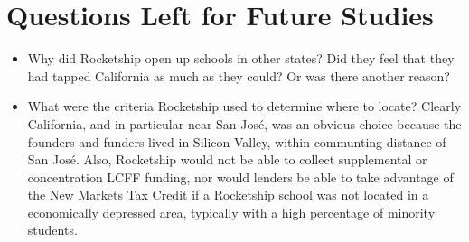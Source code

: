\section{Questions Left for Future Studies}\label{sec:future-studies}
\begin{itemize}
  \item Why did Rocketship open up schools in other states? Did they feel that they had tapped California as much as they could? Or was there another reason?
  \item What were the criteria Rocketship used to determine where to locate? Clearly California, and in particular near San José, was an obvious choice because the founders and funders lived in Silicon Valley, within communting distance of San José. Also, Rocketship would not be able to collect supplemental or concentration LCFF funding, nor would lenders be able to take advantage of the New Markets Tax Credit if a Rocketship school was not located in a economically depressed area, typically with a high percentage of minority students.
\end{itemize}

\begin{comment}
\subsection{Validity}
  \subsection{Reliability}
  \subsection{Limitations}
  \section{Evaluating the Results}
  \section{Rival Explanations}
  \section{Future Research}
\end{comment}



